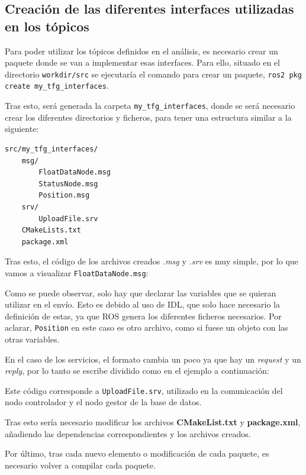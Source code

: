 \subsection{Creación de las diferentes interfaces utilizadas en los tópicos}

Para poder utilizar los tópicos definidos en el análisis, es necesario crear un paquete donde se van a implementar esas interfaces. Para ello, situado en el directorio \verb|workdir/src| se ejecutaría el comando para crear un paquete, \verb|ros2 pkg create my_tfg_interfaces|.

Tras esto, será generada la carpeta \verb|my_tfg_interfaces|, donde se será necesario crear los diferentes directorios y ficheros, para tener una estructura similar a la siguiente:
\begin{lstlisting}[language=Bash, caption=Estructura del directorio de trabajo]
src/my_tfg_interfaces/
    msg/
        FloatDataNode.msg
        StatusNode.msg
        Position.msg
    srv/
        UploadFile.srv
    CMakeLists.txt
    package.xml
\end{lstlisting}

Tras esto, el código de los archivos creados \textit{.msg} y \textit{.srv} es muy simple, por lo que vamos a visualizar \verb|FloatDataNode.msg|:



Como se puede observar, solo hay que declarar las variables que se quieran utilizar en el envío. Esto es debido al uso de IDL, que solo hace necesario la definición de estas, ya que ROS genera los diferentes ficheros necesarios. Por aclarar,  \verb|Position| en este caso es otro archivo, como si fuese un objeto con las otras variables.

En el caso de los servicios, el formato cambia un poco ya que hay un \textit{request} y un \textit{reply}, por lo tanto se escribe dividido como en el ejemplo a continuación:



Este código corresponde a \verb|UploadFile.srv|, utilizado en la comunicación del nodo controlador y el nodo gestor de la base de datos.

Tras esto sería necesario modificar los archivos \textbf{CMakeList.txt} y \textbf{package.xml}, añadiendo las dependencias correspondientes y los archivos creados.

Por último, tras cada nuevo elemento o modificación de cada paquete, es necesario volver a compilar cada paquete. 

